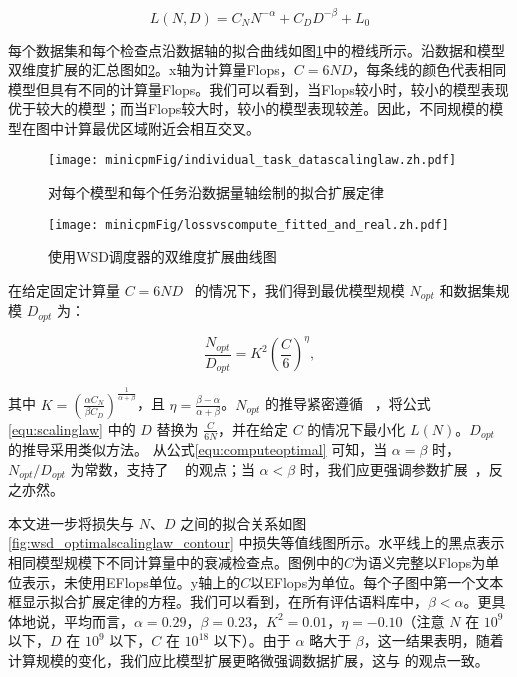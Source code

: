 \begin{equation}
    L(N, D) = C_NN^{-\alpha} + C_DD^{-\beta} + L_0
\label{equ:scalinglaw}
\end{equation}

每个数据集和每个检查点沿数据轴的拟合曲线如图\ref{fig:individual_task_datascalinglaw}中的橙线所示。沿数据和模型双维度扩展的汇总图如\ref{fig:wsd_optimalscalinglaw}。x轴为计算量Flops，$C = 6ND$，每条线的颜色代表相同模型但具有不同的计算量Flops。我们可以看到，当Flops较小时，较小的模型表现优于较大的模型；而当Flops较大时，较小的模型表现较差。因此，不同规模的模型在图中计算最优区域附近会相互交叉。


\begin{figure}
    \centering
    \texttt{[image: minicpmFig/individual\_task\_datascalinglaw.zh.pdf]}
    \caption{对每个模型和每个任务沿数据量轴绘制的拟合扩展定律}
    \label{fig:individual_task_datascalinglaw}
\end{figure}


\begin{figure}[!t]
    \centering
    \texttt{[image: minicpmFig/lossvscompute\_fitted\_and\_real.zh.pdf]}
    \caption{使用WSD调度器的双维度扩展曲线图}
    \label{fig:wsd_optimalscalinglaw}
\end{figure}

在给定固定计算量 $C = 6ND$~\citep{rae2021scaling} 的情况下，我们得到最优模型规模 $N_{opt}$ 和数据集规模 $D_{opt}$ 为： 

\begin{equation}
    \frac{N_{opt}}{D_{opt}} = K^2\left(\frac{C}{6}\right)^{\eta},
\label{equ:computeoptimal}
\end{equation}


其中 $K = (\frac{\alpha C_N}{\beta C_D})^{\frac{1}{\alpha + \beta}} $，且 $\eta=\frac{\beta - \alpha}{\alpha + \beta}$。$N_{opt}$ 的推导紧密遵循 ~\cite{hoffmann2022training}，将公式\ref{equ:scalinglaw} 中的 $D$ 替换为 $\frac{C}{6N}$，并在给定 $C$ 的情况下最小化 $L(N)$。$D_{opt}$ 的推导采用类似方法。 
从公式\ref{equ:computeoptimal} 可知，当 $\alpha = \beta$ 时，$N_{opt}/D_{opt}$ 为常数，支持了 ~\citet{hoffmann2022training} 的观点；当 $\alpha < \beta$ 时，我们应更强调参数扩展~\citep{kaplan2020scaling}，反之亦然。 

本文进一步将损失与 $N$、$D$ 之间的拟合关系如图\ref{fig:wsd_optimalscalinglaw_contour} 中损失等值线图所示。水平线上的黑点表示相同模型规模下不同计算量中的衰减检查点。图例中的$C$为语义完整以Flops为单位表示，未使用EFlops单位。y轴上的$C$以EFlops为单位。每个子图中第一个文本框显示拟合扩展定律的方程。我们可以看到，在所有评估语料库中，$\beta < \alpha$。更具体地说，平均而言，$\alpha = 0.29$，$\beta = 0.23$，$K^2 = 0.01$，$\eta = -0.10$（注意 $N$ 在 $10^9$ 以下，$D$ 在 $10^9$ 以下，$C$ 在 $10^{18}$ 以下）。由于 $\alpha$ 略大于 $\beta$，这一结果表明，随着计算规模的变化，我们应比模型扩展更略微强调数据扩展，这与\citet{hoffmann2022training} 的观点一致。

